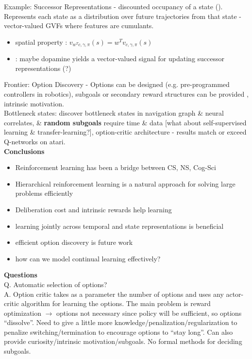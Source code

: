 \documentclass[12pt]{article}
\begin{document}
Example: Successor Representations - discounted occupancy of a state (\cite{Dayan93, Barreto16}). Represents each state as a distribution over future trajectories from that state - vector-valued GVFs where features are cumulants. 
\begin{itemize}
\item spatial property \cite{Barreto16}: $v_{w^Tc,\gamma,\pi}(s) = w^Tv_{c,\gamma,\pi}(s)$
\item \cite{Gardner2018}: maybe dopamine yields a vector-valued signal for updating successor representations (?)
\end{itemize}

Frontier: Option Discovery - Options can be designed (e.g. pre-programmed controllers in robotics), subgoals or secondary reward structures can be provided \cite{Sutton98}, intrinsic motivation. \\

Bottleneck states: \cite{Solway2014} discover bottleneck states in navigation graph \& neural correlates, \& \textbf{random subgoals} require time \& data \cite{mann15} [what about self-supervised learning \& transfer-learning?], option-critic architecture \cite{BaconHP16} - results match or exceed Q-networks on atari. \\

\textbf{Conclusions}
\begin{itemize}
    \item Reinforcement learning has been a bridge between CS, NS, Cog-Sci
    \item Hierarchical reinforcement learning is a natural approach for solving large problems efficiently
    \item Deliberation cost and intrinsic rewards help learning
    \item learning jointly across temporal and state representations is beneficial \cite{Franklin2018}
    \item efficient option discovery is future work
    \item how can we model continual learning effectively?
\end{itemize}

\textbf{Questions} \\

Q. Automatic selection of options? \\

A. Option critic takes as a parameter the number of options and uses any actor-critic algorithm for learning the options. The main problem is reward optimization $\rightarrow$ options not necessary since policy will be sufficient, so options ``dissolve''. Need to give a little more knowledge/penalization/regularization to penalize switching/termination to encourage options to ``stay long''. Can also provide curiosity/intrinsic motivation/subgoals. No formal methods for deciding subgoals. \\
\end{document}
